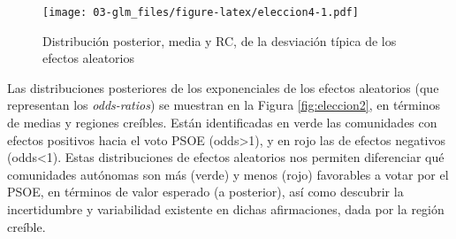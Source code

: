 \documentclass[
]{book}
\newenvironment{Shaded}{\begin{snugshade}}{\end{snugshade}}
\newcommand{\CommentTok}[1]{\textcolor[rgb]{0.56,0.35,0.01}{\textit{#1}}}
\newcommand{\ControlFlowTok}[1]{\textcolor[rgb]{0.13,0.29,0.53}{\textbf{#1}}}
\newcommand{\DecValTok}[1]{\textcolor[rgb]{0.00,0.00,0.81}{#1}}
\newcommand{\FloatTok}[1]{\textcolor[rgb]{0.00,0.00,0.81}{#1}}
\newcommand{\FunctionTok}[1]{\textcolor[rgb]{0.00,0.00,0.00}{#1}}
\newcommand{\NormalTok}[1]{#1}
\newcommand{\OtherTok}[1]{\textcolor[rgb]{0.56,0.35,0.01}{#1}}
\newcommand{\SpecialCharTok}[1]{\textcolor[rgb]{0.00,0.00,0.00}{#1}}
\newcommand{\StringTok}[1]{\textcolor[rgb]{0.31,0.60,0.02}{#1}}
\begin{document}
\begin{figure}
\centering
\texttt{[image: 03-glm\_files/figure-latex/eleccion4-1.pdf]}
\caption{\label{fig:eleccion4}Distribución posterior, media y RC, de la desviación típica de los efectos aleatorios}
\end{figure}

\begin{Shaded}
\end{Shaded}

Las distribuciones posteriores de los exponenciales de los efectos
aleatorios (que representan los \emph{odds-ratios}) se muestran en la Figura \ref{fig:eleccion2}, en términos de medias y regiones creíbles. Están identificadas en verde las comunidades con efectos positivos hacia el voto PSOE (odds\textgreater1), y en rojo las de efectos negativos (odds\textless1). Estas distribuciones de efectos aleatorios nos permiten diferenciar qué comunidades autónomas son más (verde) y menos (rojo) favorables a votar por el PSOE, en términos de valor esperado (a posterior), así como descubrir la incertidumbre y variabilidad existente en dichas afirmaciones, dada por la región creíble.
\end{document}
